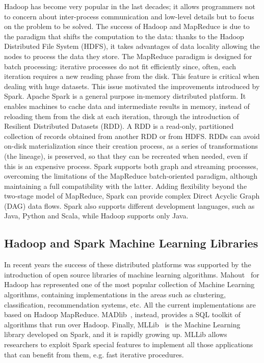 Hadoop has become very popular in the last decades; it allows programmers not to
concern about inter-process communication and low-level details but to focus on
the problem to be solved. The success of Hadoop and MapReduce is due to the
paradigm
that shifts the computation to the data: thanks to the Hadoop Distributed File
System (HDFS), it takes advantages of data locality allowing the nodes to
process the data they store.
The MapReduce paradigm is designed for batch processing:
iterative processes do not fit efficiently since, often,
each iteration requires a new reading phase from the disk.
This feature is critical when dealing with huge datasets.
This issue motivated the improvements introduced by Spark.
Apache Spark is a general purpose in-memory
distributed platform. It enables machines to cache data and intermediate results
in memory, instead of reloading them from the disk at each iteration, through
the introduction of Resilient Distributed Datasets (RDD). A RDD is a read-only,
partitioned collection of records obtained from another RDD or from HDFS.
RDDs can avoid on-disk materialization since their creation process,
as a series of transformations (the lineage), is preserved,
so that they can be recreated when needed, even if this is an expensive process.
Spark supports both graph and streaming processes, overcoming the
limitations of the MapReduce batch-oriented paradigm, although maintaining a
full
compatibility with the latter.
Adding flexibility beyond the two-stage model of
MapReduce, Spark can provide complex Direct Acyclic Graph (DAG) data
flows. Spark also supports different development languages, such as
Java, Python and Scala, while Hadoop supports only Java.

\subsection{Hadoop and Spark Machine Learning Libraries}
In recent years the
success of these distributed platforms was supported by the introduction of open
source libraries of machine learning algorithms.
Mahout~\cite{Mahout} for Hadoop has represented one of the most popular
collection of Machine Learning algorithms, containing implementations in the
areas such as clustering, classification, recommendation systems, etc. All the
current implementations are based on Hadoop MapReduce.
MADlib~\cite{madlib},
instead, provides a SQL toolkit of algorithms that run over Hadoop. Finally,
MLLib~\cite{MLLib} is the Machine Learning library developed on Spark, and it is
rapidly growing up. MLLib allows researchers to exploit Spark special features
to implement all those applications that can benefit from them, e.g. fast
iterative procedures.

